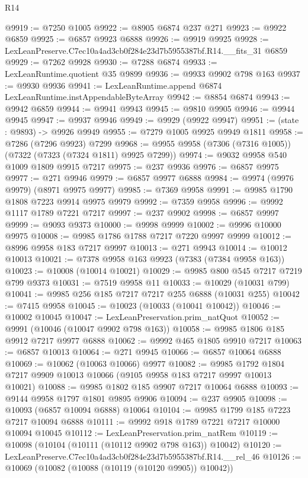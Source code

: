 \begin{lexlean}{R14}
\begin{coremodule}
@9919 := @7250 @1005
@9922 := @8905 @6874 @237 @271
@9923 := @9922 @6859
@9925 := @6857 @9923 @6888
@9926 := @9919 @9925
@9928 := LexLeanPreserve.C7ec10a4ad3cb0f284e23d7b5955387bf.R14.__fits_31 @6859
@9929 := @7262 @9928
@9930 := @7288 @6874
@9933 := LexLeanRuntime.quotient @35 @9899
@9936 := @9933 @9902 @798 @163
@9937 := @9930 @9936
@9941 := LexLeanRuntime.append @6874 LexLeanRuntime.instAppendableByteArray
@9942 := @8854 @6874
@9943 := @9942 @6859
@9944 := @9941 @9943
@9945 := @9810 @9905
@9946 := @9944 @9945
@9947 := @9937 @9946
@9949 := @9929 (@9922 @9947)
@9951 := (state : @9893) -> @9926 @9949
@9955 := @7279 @1005 @9925 @9949 @1811
@9958 := @7286 (@7296 @9923) @7299
@9968 := @9955 @9958 (@7306 (@7316 @1005)) (@7322 (@7323 (@7324 @1811) @9925 @7299))
@9974 := @9032 @9958 @540 @1009 @1809 @9915 @7217
@9975 := @237 @9936
@9976 := @6857 @9975
@9977 := @271 @9946
@9979 := @6857 @9977 @6888
@9984 := @9974 (@9976 @9979) (@8971 @9975 @9977)
@9985 := @7369 @9958
@9991 := @9985 @1790 @1808 @7223 @9914 @9975 @9979
@9992 := @7359 @9958
@9996 := @9992 @1117 @1789 @7221 @7217
@9997 := @237 @9902
@9998 := @6857 @9997
@9999 := @9093 @9373
@10000 := @9998 @9999
@10002 := @9996 @10000 @9975
@10008 := @9985 @1786 @1788 @7217 @7220 @9997 @9999
@10012 := @8996 @9958 @183 @7217 @9997
@10013 := @271 @9943
@10014 := @10012 @10013
@10021 := @7378 @9958 @163 @9923 (@7383 (@7384 @9958 @163))
@10023 := @10008 (@10014 @10021)
@10029 := @9985 @800 @545 @7217 @7219 @799 @9373
@10031 := @7519 @9958 @11
@10033 := @10029 (@10031 @799)
@10041 := @9985 @256 @185 @7217 @7217 @255 @6888 (@10031 @255)
@10042 := @7415 @9958
@10045 := @10023 (@10033 (@10041 @10042))
@10046 := @10002 @10045
@10047 := LexLeanPreservation.prim_natQuot
@10052 := @9991 (@10046 (@10047 @9902 @798 @163))
@10058 := @9985 @1806 @185 @9912 @7217 @9977 @6888
@10062 := @9992 @465 @1805 @9910 @7217
@10063 := @6857 @10013
@10064 := @271 @9945
@10066 := @6857 @10064 @6888
@10069 := @10062 (@10063 @10066) @9977
@10082 := @9985 @1792 @1804 @7217 @9909 @10013 @10066 (@9105 @9958 @183 @7217 @9997 @10013 @10021)
@10088 := @9985 @1802 @185 @9907 @7217 @10064 @6888
@10093 := @9144 @9958 @1797 @1801 @9895 @9906
@10094 := @237 @9905
@10098 := @10093 (@6857 @10094 @6888) @10064
@10104 := @9985 @1799 @185 @7223 @7217 @10094 @6888
@10111 := @9992 @918 @1789 @7221 @7217 @10000 @10094 @10045
@10112 := LexLeanPreservation.prim_natRem
@10119 := @10098 (@10104 (@10111 (@10112 @9902 @798 @163)) @10042)
@10120 := LexLeanPreserve.C7ec10a4ad3cb0f284e23d7b5955387bf.R14.__rel_46
@10126 := @10069 (@10082 (@10088 (@10119 (@10120 @9905)) @10042))

\end{coremodule}
\end{lexlean}
